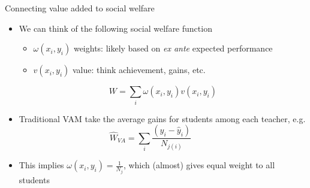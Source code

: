 \documentclass[t,aspectratio=169,11pt]{beamer}
\begin{document}
\begin{frame}{Connecting value added to social welfare}

\begin{itemize}
    \item We can think of the following social welfare function
    \begin{itemize}
        \item $\omega(x_i,y_i)$ weights: likely based on \textit{ex ante} expected performance
        \item $v(x_i,y_i)$ value: think achievement, gains, etc.
    \end{itemize}
    \[
    W  = \sum_i \omega(x_i,y_i) v(x_i,y_i) 
    \] 
    
    \item Traditional VAM take the average gains for students among each teacher, e.g.
    \[
    \hat{W}_{VA}  = \sum_i \frac{(y_i-\hat{y}_i)}{N_{j(i)}} \hspace{3em}
    \]
    
    \item This implies $\omega(x_i,y_i)=\frac{1}{N_j}$, which (almost) gives equal weight to all students

\end{itemize}


\end{frame}


\end{document}
